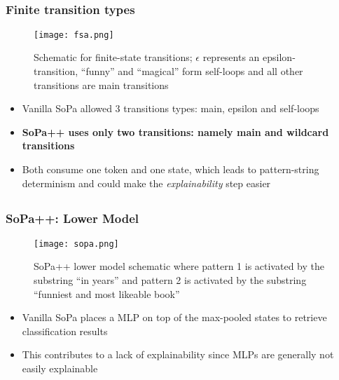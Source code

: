 \documentclass[10pt]{beamer}
\let\oldcitep=\citep
\renewcommand\citep[1]{{\textcolor{blue}{\oldcitep{#1}}}}
\begin{document}
  \subsection{}
	\begin{frame}
		\frametitle{Finite transition types}
    \begin{figure}				       
			\captionsetup{justification=centering}
      \texttt{[image: fsa.png]}
      \caption{Schematic for finite-state transitions; $\epsilon$ represents an epsilon-transition, ``funny'' and ``magical'' form self-loops and all other transitions are main transitions \citep{schwartz2018sopa}}
    \end{figure}
    \begin{itemize} 
      \item Vanilla SoPa allowed 3 transitions types: main, epsilon and self-loops
      \item \textbf{SoPa++ uses only two transitions: namely main and wildcard transitions}
      \item Both consume one token and one state, which leads to pattern-string determinism and could make the \textit{explainability} step easier
    \end{itemize} 
	\end{frame} 
  
  \subsection{}
	\begin{frame}
		\frametitle{SoPa++: Lower Model}
    \begin{figure}				       
			\captionsetup{justification=centering}
      \texttt{[image: sopa.png]}
      \caption{SoPa++ lower model schematic where pattern 1 is activated by the substring ``in years'' and pattern 2 is activated by the substring ``funniest and most likeable book'' \citep{schwartz2018sopa}}
    \end{figure}
    \begin{itemize}
      \setlength\itemsep{0.6em}
      \item Vanilla SoPa places a MLP on top of the max-pooled states to retrieve classification results
      \item This contributes to a lack of explainability since MLPs are generally not easily explainable
    \end{itemize} 
	\end{frame}
\end{document}
